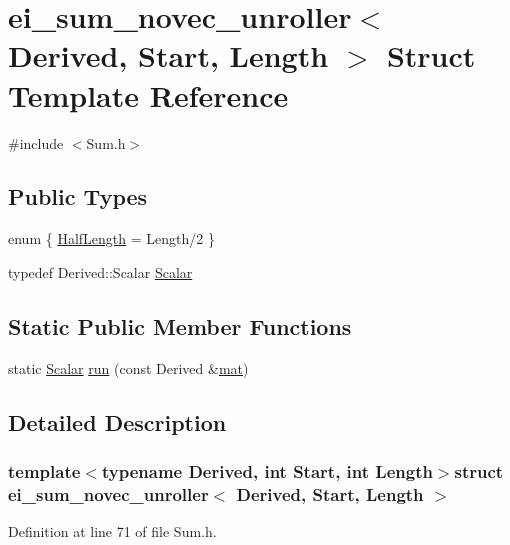 \hypertarget{structei__sum__novec__unroller}{\section{ei\-\_\-sum\-\_\-novec\-\_\-unroller$<$ Derived, Start, Length $>$ Struct Template Reference}
\label{structei__sum__novec__unroller}
}


{\ttfamily \#include $<$Sum.\-h$>$}

\subsection*{Public Types}
\begin{DoxyCompactItemize}
\item 
enum \{ \hyperlink{structei__sum__novec__unroller_adc17f4323785b577f80948d7cdc7c64aa86e290a0eed704f671cdd6f9955dabf3}{Half\-Length} = Length/2
 \}
\item 
typedef Derived\-::\-Scalar \hyperlink{structei__sum__novec__unroller_adfeab8771427bd1565101fb2b965b08e}{Scalar}
\end{DoxyCompactItemize}
\subsection*{Static Public Member Functions}
\begin{DoxyCompactItemize}
\item 
static \hyperlink{structei__sum__novec__unroller_adfeab8771427bd1565101fb2b965b08e}{Scalar} \hyperlink{structei__sum__novec__unroller_ac4d01640efce06ea1779d576d21cd1ce}{run} (const Derived \&\hyperlink{uavobjecttemplate_8m_a16a51e808b16c46bbfd36da2e37cd123}{mat})
\end{DoxyCompactItemize}


\subsection{Detailed Description}
\subsubsection*{template$<$typename Derived, int Start, int Length$>$struct ei\-\_\-sum\-\_\-novec\-\_\-unroller$<$ Derived, Start, Length $>$}



Definition at line 71 of file Sum.\-h.



